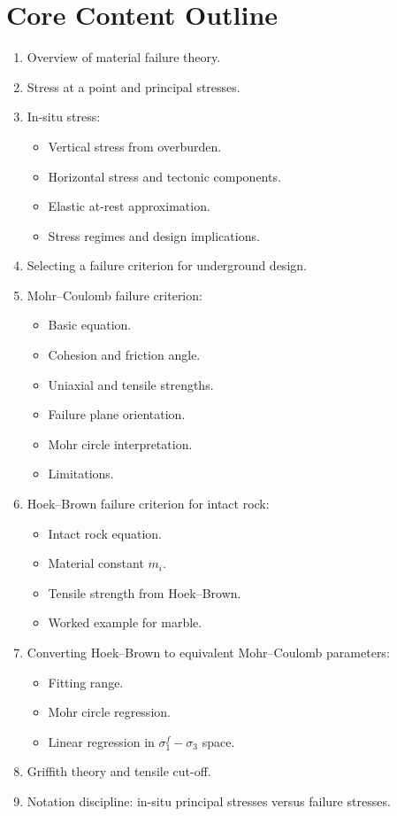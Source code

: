 \documentclass[12pt,oneside]{book}
\begin{document}
\section{Core Content Outline}
\begin{enumerate}
    \item Overview of material failure theory.
    \item Stress at a point and principal stresses.
    \item In-situ stress:
    \begin{itemize}
        \item Vertical stress from overburden.
        \item Horizontal stress and tectonic components.
        \item Elastic at-rest approximation.
        \item Stress regimes and design implications.
    \end{itemize}
    \item Selecting a failure criterion for underground design.
    \item Mohr--Coulomb failure criterion:
    \begin{itemize}
        \item Basic equation.
        \item Cohesion and friction angle.
        \item Uniaxial and tensile strengths.
        \item Failure plane orientation.
        \item Mohr circle interpretation.
        \item Limitations.
    \end{itemize}
    \item Hoek--Brown failure criterion for intact rock:
    \begin{itemize}
        \item Intact rock equation.
        \item Material constant \(m_i\).
        \item Tensile strength from Hoek--Brown.
        \item Worked example for marble.
    \end{itemize}
    \item Converting Hoek--Brown to equivalent Mohr--Coulomb parameters:
    \begin{itemize}
        \item Fitting range.
        \item Mohr circle regression.
        \item Linear regression in \(\sigma_1^f-\sigma_3\) space.
    \end{itemize}
    \item Griffith theory and tensile cut-off.
    \item Notation discipline: in-situ principal stresses versus failure stresses.
\end{enumerate}
\end{document}
